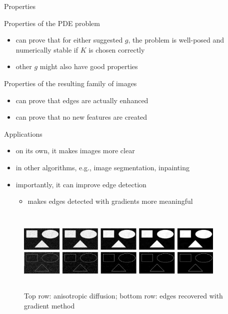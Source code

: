 \documentclass{beamer}
\begin{document}
\begin{frame}{Properties}

    \begin{block}{Properties of the PDE problem}
        \begin{itemize}
            \item can prove that for either suggested $g$, the problem is well-posed and numerically stable if $K$ is chosen correctly
            \item other $g$ might also have good properties
        \end{itemize}
    \end{block}
    \begin{block}{Properties of the resulting family of images}
        \begin{itemize}
            \item can prove that edges are actually enhanced
            \item can prove that no new features are created
        \end{itemize}
    \end{block}

\end{frame}

\begin{frame}{Applications}

        \begin{itemize}
            \item on its own, it makes images more clear
            \item in other algorithms, e.g., image segmentation, inpainting
            \item importantly, it can improve edge detection 
                \begin{itemize}
                    \item makes edges detected with gradients more meaningful
                \end{itemize}
        \end{itemize}
    \begin{figure}[h!]
        \centering            \includegraphics[width=10cm, height=4cm]{edgedetwdif.png}
        \caption{Top row: anisotropic diffusion; bottom row: edges recovered with gradient method}
    \end{figure}
    
\end{frame}
\end{document}
